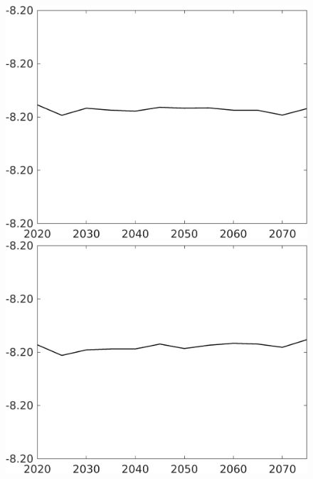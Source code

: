 \documentclass[12pt]{article}
\begin{document}
\begin{figure}[h!!]
\begin{minipage}[]{0.32\textwidth}
	\end{minipage}	
	\begin{minipage}[]{0.32\textwidth}
		\includegraphics[width=1\textwidth]{../../codding_model/own_basedOnFried/optimalPol_010922_revision/figures/all_13Sept22/CompTaul_Equlab_LFBAUPer_Reg0_F_spillover0_nsk1_xgr1_knspil0_sep1_countec0_GovRev0_etaa0.79.png}
	\end{minipage}	
	\begin{minipage}[]{0.32\textwidth}
		\includegraphics[width=1\textwidth]{../../codding_model/own_basedOnFried/optimalPol_010922_revision/figures/all_13Sept22/CompTaul_Equlab_LFBAUPer_Reg0_G_spillover0_nsk1_xgr1_knspil0_sep1_countec0_GovRev0_etaa0.79.png}

\end{minipage}
\end{figure}
\end{document}

